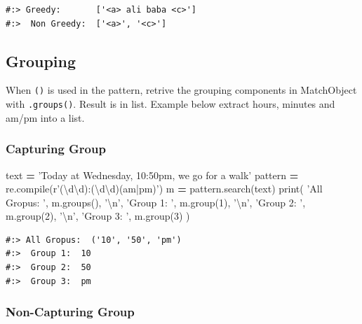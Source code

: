 \documentclass[
]{book}
\newenvironment{Shaded}{\begin{snugshade}}{\end{snugshade}}
\newcommand{\BuiltInTok}[1]{#1}
\newcommand{\CharTok}[1]{\textcolor[rgb]{0.5,0.5,0.5}{#1}}
\newcommand{\DecValTok}[1]{\textcolor[rgb]{0.06,0.06,0.06}{#1}}
\newcommand{\NormalTok}[1]{#1}
\newcommand{\OperatorTok}[1]{\textcolor[rgb]{0.43,0.43,0.43}{\textbf{#1}}}
\newcommand{\StringTok}[1]{\textcolor[rgb]{0.5,0.5,0.5}{#1}}
\newcommand{\VerbatimStringTok}[1]{\textcolor[rgb]{0.5,0.5,0.5}{#1}}
\begin{document}
\begin{verbatim}
#:> Greedy:       ['<a> ali baba <c>'] 
#:>  Non Greedy:  ['<a>', '<c>']
\end{verbatim}

\hypertarget{grouping-1}{%
\subsection{Grouping}\label{grouping-1}}

When \texttt{()} is used in the pattern, retrive the grouping components in MatchObject with \texttt{.groups()}. Result is in list. Example below extract hours, minutes and am/pm into a list.

\hypertarget{capturing-group}{%
\subsubsection{Capturing Group}\label{capturing-group}}

\begin{Shaded}
\begin{Highlighting}[]
\NormalTok{text }\OperatorTok{=} \StringTok{'Today at Wednesday, 10:50pm, we go for a walk'}
\NormalTok{pattern }\OperatorTok{=}\NormalTok{ re.}\BuiltInTok{compile}\NormalTok{(}\VerbatimStringTok{r'(\textbackslash{}d\textbackslash{}d):(\textbackslash{}d\textbackslash{}d)(am|pm)'}\NormalTok{)}
\NormalTok{m }\OperatorTok{=}\NormalTok{ pattern.search(text)}
\BuiltInTok{print}\NormalTok{(}
  \StringTok{'All Gropus: '}\NormalTok{, m.groups(), }\StringTok{'}\CharTok{\textbackslash{}n}\StringTok{'}\NormalTok{,}
  \StringTok{'Group 1: '}\NormalTok{, m.group(}\DecValTok{1}\NormalTok{), }\StringTok{'}\CharTok{\textbackslash{}n}\StringTok{'}\NormalTok{,}
  \StringTok{'Group 2: '}\NormalTok{, m.group(}\DecValTok{2}\NormalTok{), }\StringTok{'}\CharTok{\textbackslash{}n}\StringTok{'}\NormalTok{,}
  \StringTok{'Group 3: '}\NormalTok{, m.group(}\DecValTok{3}\NormalTok{) )}
\end{Highlighting}
\end{Shaded}

\begin{verbatim}
#:> All Gropus:  ('10', '50', 'pm') 
#:>  Group 1:  10 
#:>  Group 2:  50 
#:>  Group 3:  pm
\end{verbatim}

\hypertarget{non-capturing-group}{%
\subsubsection{Non-Capturing Group}\label{non-capturing-group}}
\end{document}
